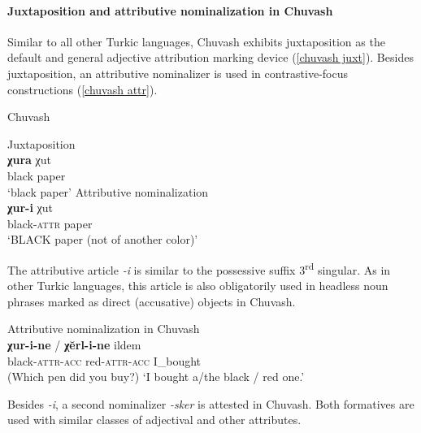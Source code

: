 \paragraph{Juxtaposition and attributive nominalization in Chuvash}\label{chuvash synchr}
Similar to all other Turkic languages, Chuvash exhibits juxtaposition as the default and general adjective attribution marking device (\ref{chuvash juxt}). Besides juxtaposition, an attributive nominalizer is used in contrastive-focus constructions (\ref{chuvash attr}).
\begin{exe}
\ex	
\rm{Chuvash \citep{clark1998a}}
\begin{xlist}
\ex 	
\label{chuvash juxt}
\rm{Juxtaposition}\\
\gll	\textbf{χura} χut\\
	black paper\\
\glt	‘black paper’
\ex	
\label{chuvash attr}
\rm{Attributive nominalization}\\
\gll	\textbf{χur-i} χut\\					 		
	black-\textsc{attr} paper\\
\glt	‘BLACK paper (not of another color)’
\end{xlist}
\end{exe}
The attributive article \textit{-i} is similar to the possessive suffix 3\textsuperscript{rd} singular. As in other Turkic languages, this article is also obligatorily used in headless noun phrases marked as direct (accusative) objects in Chuvash.
\begin{exe}
\ex 
\label{chuvash headless acc}	
\rm{Attributive nominalization in Chuvash \citep[7]{benzing1993b}}\\
\gll	\textbf{χur-i-ne} / \textbf{χĕrl-i-ne} ildem\\
 	black-\textsc{attr}-\textsc{acc} { } red-\textsc{attr}-\textsc{acc} I\_bought\\
\glt 	(Which pen did you buy?) ‘I bought a/the black / red one.’
\end{exe}
Besides \textit{-i}, a second nominalizer \textit{-sker} is attested in Chuvash. Both formatives are used with similar classes of adjectival and other attributes.
